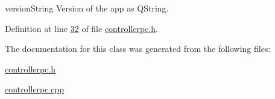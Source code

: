 version\+String Version of the app as Q\+String. 



Definition at line \hyperlink{controllerpc_8h_source_l00032}{32} of file \hyperlink{controllerpc_8h_source}{controllerpc.\+h}.



The documentation for this class was generated from the following files\+:\begin{DoxyCompactItemize}
\item 
\hyperlink{controllerpc_8h}{controllerpc.\+h}\item 
\hyperlink{controllerpc_8cpp}{controllerpc.\+cpp}\end{DoxyCompactItemize}
